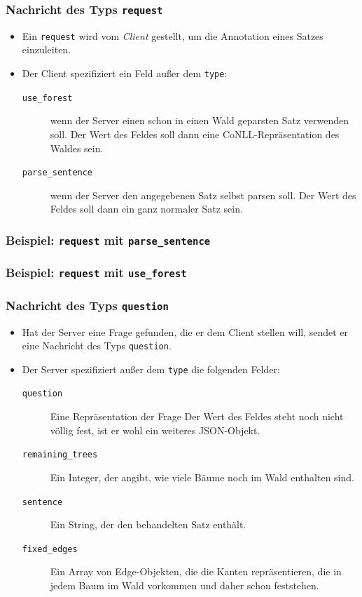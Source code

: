 \documentclass{beamer} %
\begin{document}
\begin{frame}
    \frametitle{Nachricht des Typs \texttt{request}}
    \begin{itemize}
        \item Ein \texttt{request} wird vom \emph{Client} gestellt, um die Annotation eines Satzes einzuleiten.
        \item Der Client spezifiziert ein Feld außer dem \texttt{type}:
            \begin{description}
                \item[\texttt{use\_forest}] wenn der Server einen schon in einen Wald geparsten Satz verwenden soll.
                    Der Wert des Feldes soll dann eine CoNLL-Repräsentation des Waldes sein.
                \item[\texttt{parse\_sentence}] wenn der Server den angegebenen Satz selbst parsen soll.
                    Der Wert des Feldes soll dann ein ganz normaler Satz sein.
            \end{description}
    \end{itemize}
\end{frame}

\begin{frame}
    \frametitle{Beispiel: \texttt{request} mit \texttt{parse\_sentence}}
    
\end{frame}

\begin{frame}
    \frametitle{Beispiel: \texttt{request} mit \texttt{use\_forest}}
    
\end{frame}

\begin{frame}
    \frametitle{Nachricht des Typs \texttt{question}}
    \begin{itemize}
        \item Hat der Server eine Frage gefunden, die er dem Client stellen will, sendet er eine Nachricht des Typs \texttt{question}.
        \item Der Server spezifiziert außer dem \texttt{type} die folgenden Felder:
            \begin{description}
                \item[\texttt{question}] Eine Repräsentation der Frage
                    Der Wert des Feldes steht noch nicht völlig fest, ist er wohl ein weiteres JSON-Objekt.
                \item[\texttt{remaining\_trees}] Ein Integer, der angibt, wie viele Bäume noch im Wald enthalten sind.
                \item[\texttt{sentence}] Ein String, der den behandelten Satz enthält.
                \item[\texttt{fixed\_edges}] Ein Array von Edge-Objekten, die die Kanten repräsentieren, die in jedem Baum im Wald vorkommen und daher schon feststehen.
            \end{description}
    \end{itemize}
\end{frame}
\end{document}
